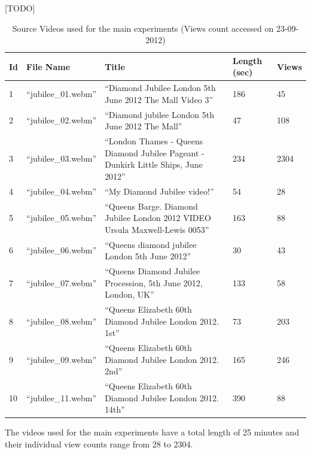 [TODO]


\begin{table}
   \begin{tabular}{ | l | l | p{8cm} | p{1.3cm} | l |}
     \hline
     \textbf{Id} & \textbf{File Name}	          & \textbf{Title}	  & \textbf{Length (sec)} & \textbf{Views} \\ \hline
     1	 & ``jubilee\_01.webm''	& ``Diamond Jubilee London 5th June 2012 The Mall Video 3'' & 186                             & 45   \\ \hline
     2	 & ``jubilee\_02.webm''	& ``Diamond jubilee London 5th June 2012 The Mall'' & 47                                      & 108  \\ \hline
     3	 & ``jubilee\_03.webm''	& ``London Thames - Queens Diamond Jubilee Pageant - Dunkirk Little Ships, June 2012'' & 234  & 2304\\ \hline
     4	 & ``jubilee\_04.webm''	& ``My Diamond Jubilee video!'' & 54                                                          & 28   \\ \hline
     5	 & ``jubilee\_05.webm''	& ``Queens Barge. Diamond Jubilee London 2012 VIDEO Ursula Maxwell-Lewis 0053'' & 163         & 88   \\ \hline
     6	 & ``jubilee\_06.webm''	& ``Queens diamond jubilee London 5th June 2012'' & 30                                        & 43   \\ \hline
     7	 & ``jubilee\_07.webm''	& ``Queens Diamond Jubilee Procession, 5th June 2012, London, UK'' & 133                      & 58   \\ \hline
     8	 & ``jubilee\_08.webm''	& ``Queens Elizabeth 60th Diamond Jubilee London 2012. 1st'' & 73                             & 203  \\ \hline
     9	 & ``jubilee\_09.webm''	& ``Queens Elizabeth 60th Diamond Jubilee London 2012. 2nd'' & 165                            & 246  \\ \hline
     10 & ``jubilee\_11.webm''	& ``Queens Elizabeth 60th Diamond Jubilee London 2012. 14th'' & 390                           & 88   \\ \hline
   \end{tabular}
   \caption{Source Videos used for the main experiments (Views count accessed on 23-09-2012)}
   \label{videos}
\end{table}

The videos used for the main experiments have a total length of 25 minutes and their individual view counts range from 28 to 2304. 

